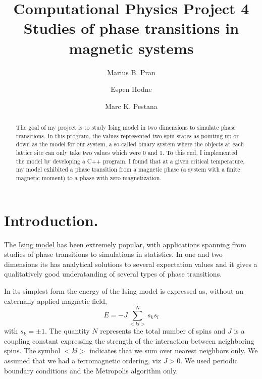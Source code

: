 \documentclass[10pt,showpacs,preprintnumbers,footinbib,amsmath,amssymb,aps,prl,twocolumn,groupedaddress,superscriptaddress,showkeys]{revtex4-1}
\begin{document}
\title[CPP2]{Computational Physics Project 4\\
\large{Studies of phase transitions in magnetic systems}}

\author{Marius B. Pran}
\author{Espen Hodne} 
\author{Marc K. Pestana}

\begin{abstract}
The goal of my project is to study Ising model in two dimensions to simulate phase transitions. In this program, the values represented two spin states as pointing up or down as the model for our system, a so-called binary system where the objects at each lattice site can only take two values which were $0$ and $1$. To this end, I implemented the model by developing a C++ program. I found that at a given critical temperature, my model exhibited a phase transition from a magnetic phase (a system with a finite magnetic moment) to a phase with zero magnetization.
\end{abstract}


\maketitle



\section{Introduction.}
The \href{{https://en.wikipedia.org/wiki/Ising_model}}{Ising model} has been extremely popular, with applications spanning from studies of phase transitions to simulations in statistics. In one and two dimensions its has analytical solutions to several expectation values and it gives a qualitatively  good underatanding of several types of phase transitions.  

In its simplest form
the energy of the Ising model is expressed as, without an externally applied magnetic field, 
\[
E=-J\sum_{< kl >}^{N}s_ks_l 
\]
with
$s_k=\pm 1$. The quantity $N$ represents the total number of spins and $J$ is a coupling
constant expressing the strength of the interaction between
neighboring spins.  The symbol $<kl>$ indicates that we sum over
nearest neighbors only. We assumed that we had a ferromagnetic
ordering, viz $J> 0$.  We used periodic boundary conditions and
the Metropolis algorithm only. 
\end{document}
